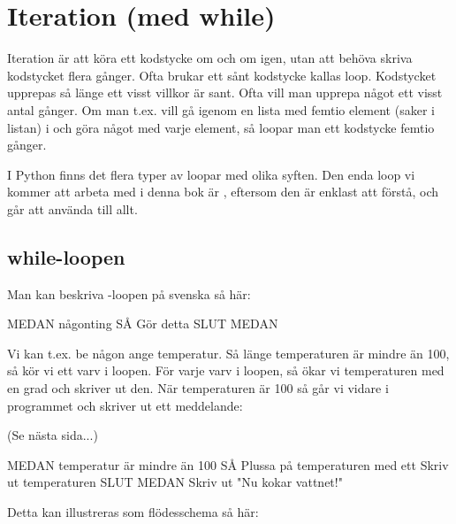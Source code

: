 %
%

\chapter{Iteration (med while)}\label{ch:iteration}
Iteration är att köra ett kodstycke om och om igen, utan att behöva skriva kodstycket flera gånger. Ofta brukar ett sånt kodstycke kallas loop. Kodstycket upprepas så länge ett visst villkor är sant. Ofta vill man upprepa något ett visst antal gånger. Om man t.ex. vill gå igenom en lista med femtio element (saker i listan) i och göra något med varje element, så loopar man ett kodstycke femtio gånger.

I Python finns det flera typer av loopar med olika syften. Den enda loop vi kommer att arbeta med i denna bok är , eftersom den är enklast att förstå, och går att använda till allt.

\section{while-loopen}
Man kan beskriva -loopen på svenska så här:

\begin{pseudo}
MEDAN någonting SÅ
   Gör detta
SLUT MEDAN
\end{pseudo}

Vi kan t.ex. be någon ange temperatur. Så länge temperaturen är mindre än 100, så kör vi ett varv i loopen. För varje varv i loopen, så ökar vi temperaturen med en grad och skriver ut den. När temperaturen är 100 så går vi vidare i programmet och skriver ut ett meddelande:

(Se nästa sida...)
\newpage
\begin{pseudo}
MEDAN temperatur är mindre än 100 SÅ
   Plussa på temperaturen med ett
   Skriv ut temperaturen
SLUT MEDAN
Skriv ut "Nu kokar vattnet!"
\end{pseudo}

Detta kan illustreras som flödesschema så här:


